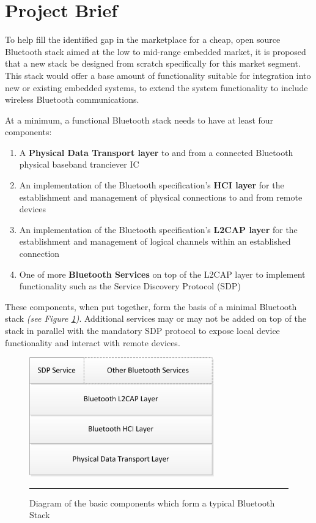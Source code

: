 \section{Project Brief}

To help fill the identified gap in the marketplace for a cheap, open source Bluetooth stack aimed at the low to mid-range embedded market, it is proposed that a new stack be designed from scratch specifically for this market segment. This stack would offer a base amount of functionality suitable for integration into new or existing embedded systems, to extend the system functionality to include wireless Bluetooth communications.

At a minimum, a functional Bluetooth stack needs to have at least four components:

\begin{enumerate}
	\item A \textbf{Physical Data Transport layer} to and from a connected Bluetooth physical baseband tranciever IC
	\item An implementation of the Bluetooth specification's \textbf{HCI layer} for the establishment and management of physical connections to and from remote devices
	\item An implementation of the Bluetooth specification's \textbf{L2CAP layer} for the establishment and management of logical channels within an established connection
	\item One of more \textbf{Bluetooth Services} on top of the L2CAP layer to implement functionality such as the Service Discovery Protocol (SDP)
\end{enumerate}

These components, when put together, form the basis of a minimal Bluetooth stack \emph{(see Figure \ref{fig:btstack})}. Additional services may or may not be added on top of the stack in parallel with the mandatory SDP protocol to expose local device functionality and interact with remote devices.

\begin{figure}[H]
	\centering
		\includegraphics[width=80mm]{./Figures/BluetoothStack.png}
	\rule{35em}{0.5pt}
	\caption[Diagram of a typical Bluetooth Stack]{Diagram of the basic components which form a typical Bluetooth Stack}
	\label{fig:btstack}
\end{figure}

